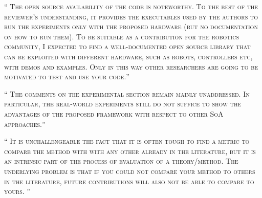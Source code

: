 \documentclass[10pt]{article}
\newcommand{\referee}[1]{\;
  \begin{minipage}[t]{.95\textwidth}
    ``{\small\color{red} \textsc{#1}}''
  \end{minipage}\medskip
  }
\begin{document}
\begin{enumerate}[label={[R3:\,\arabic{enumi}]}]

\item\label{reply:R3:3}
\referee{The open source availability of the code is noteworthy. To the best
of the reviewer's understanding, it provides the executables used by
the authors to run the experiments only with the proposed hardware (but
no documentation on how to run them). To be suitable as a contribution
for the robotics community, I expected to find a well-documented open
source library that can be exploited with different hardware, such as
robots, controllers etc, with demos and examples. Only in this way
other researchers are going to be motivated to test and use your code.}


\item\label{reply:R3:4}
\referee{The comments on the experimental section remain mainly unaddressed.
In particular, the real-world experiments still do not suffice to show
the advantages of the proposed framework with respect to other SoA
approaches.}


\item\label{reply:R3:5}
\referee{
It is unchallengeable the fact that it is often tough to
find a metric to compare the method with with any other already in the
literature, but it is an intrinsic part of the process of evaluation of
a theory/method. The underlying problem is that if you could not
compare your method to others in the literature, future contributions
will also not be able to compare to yours. 
}


\end{enumerate}
\end{document}
